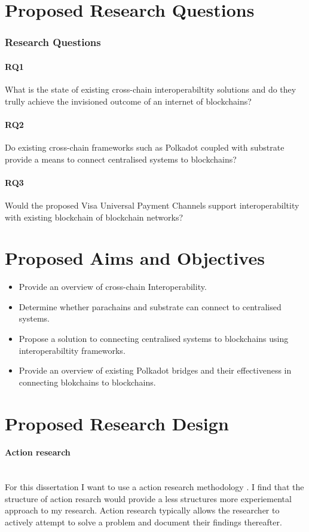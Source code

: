 \documentclass[12pt]{article}
\begin{document}
\section{Proposed Research Questions}
\subsubsection{Research Questions}
\paragraph{RQ1} What is the state of existing cross-chain interoperabiltity solutions and do they trully achieve the invisioned outcome of an internet of blockchains?
\paragraph{RQ2} Do existing cross-chain frameworks such as Polkadot coupled with substrate provide a means to connect centralised systems to blockchains?
\paragraph{RQ3} Would the proposed Visa Universal Payment Channels support interoperabiltity with existing blockchain of blockchain networks?

\section{Proposed Aims and Objectives}
\begin{itemize}
    \item Provide an overview of cross-chain Interoperability.
    \item Determine whether parachains and substrate can connect to centralised systems.
    \item Propose a solution to connecting centralised systems to blockchains using interoperabiltity frameworks.
    \item Provide an overview of existing Polkadot bridges and their effectiveness in connecting blokchains to blockchains.
\end{itemize}

\section{Proposed Research Design}
\paragraph{Action research}\mbox{} \\
For this dissertation I want to use a action research methodology \autocite{10.5555/2842927}. I find that the structure of action resarch would provide a
less structures more experiemental approach to my research. Action research typically allows the researcher to actively attempt to solve a problem and document their findings thereafter.
\end{document}
